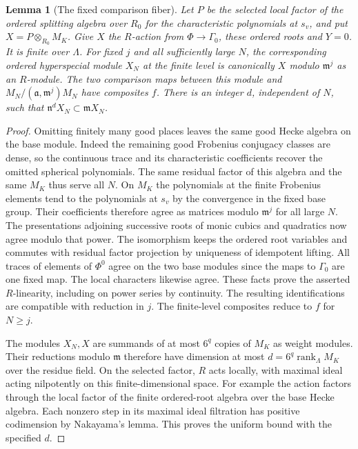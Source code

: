 \documentclass[a4paper,11pt]{article}
\newtheorem{lemma}[proposition]{Lemma}
\theoremstyle{definition}
\theoremstyle{remark}
\numberwithin{equation}{section}
\begin{document}
\begin{lemma}[The fixed comparison fiber]\leavevmode
\label{lem:fixedfiber408}
Let \(P\) be the selected local factor of the ordered
splitting algebra over \(R_0\) for the characteristic
polynomials at \(s_v\), and put \(X=P\otimes_{R_0}M_K\).
Give \(X\) the \(R\)-action from \(\Phi\to\Gamma_0\), these
ordered roots and \(Y=0\). It is finite over \(\Lambda\).
For fixed \(j\) and all sufficiently large \(N\), the
corresponding ordered hyperspecial module \(X_N\) at
the finite level is canonically \(X\) modulo \(\mathfrak m^j\)
as an \(R\)-module. The two comparison maps between this
module and \(M_N/(\mathfrak a,\mathfrak m^j)M_N\) have
composites \(f\). There is an integer \(d\), independent
of \(N\), such that \(\mathfrak n^d X_N\subset\mathfrak m X_N\).
\end{lemma}
\begin{proof}
Omitting finitely many good places leaves the same good
Hecke algebra on the base module. Indeed the remaining good
Frobenius conjugacy classes are dense, so the continuous
trace and its characteristic coefficients recover the
omitted spherical polynomials. The same residual factor
of this algebra and the same \(M_K\) thus serve all \(N\).
On \(M_K\) the polynomials at the finite Frobenius elements
tend to the polynomials at \(s_v\) by the convergence in the
fixed base group. Their coefficients therefore agree as
matrices modulo \(\mathfrak m^j\) for all large \(N\).
The presentations adjoining successive roots of monic
cubics and quadratics now agree modulo that power. The
isomorphism keeps the ordered root variables and commutes
with residual factor projection by uniqueness of idempotent
lifting. All traces of elements of \(\Phi^0\) agree on
the two base modules since the maps to \(\Gamma_0\) are
one fixed map. The local characters likewise agree. These
facts prove the asserted \(R\)-linearity, including on
power series by continuity. The resulting identifications
are compatible with reduction in \(j\).
The finite-level composites reduce to \(f\) for \(N\ge j\).

The modules \(X_N,X\) are summands of at most \(6^q\)
copies of \(M_K\) as weight modules. Their reductions
modulo \(\mathfrak m\) therefore have dimension at most
\(d=6^q\operatorname{rank}_\Lambda M_K\) over the residue
field. On the selected factor, \(R\) acts locally, with
maximal ideal acting nilpotently on this finite-dimensional
space. For example the action factors through the local
factor of the finite ordered-root algebra over the base
Hecke algebra. Each nonzero step in its maximal ideal
filtration has positive codimension by Nakayama's lemma.
This proves the uniform bound with the specified \(d\).
\end{proof}
\end{document}
